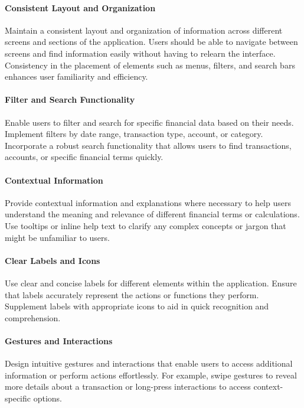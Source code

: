 \paragraph{Consistent Layout and Organization}
Maintain a consistent layout and organization of information across different 
screens and sections of the application. Users should be able to navigate between screens and find information easily 
without having to relearn the interface. Consistency in the placement of elements such as menus, filters, and search 
bars enhances user familiarity and efficiency.

\paragraph{Filter and Search Functionality}
Enable users to filter and search for specific financial data based on their needs. 
Implement filters by date range, transaction type, account, or category. Incorporate a robust search functionality 
that allows users to find transactions, accounts, or specific financial terms quickly.

\paragraph{Contextual Information}
Provide contextual information and explanations where necessary to help users understand the 
meaning and relevance of different financial terms or calculations. Use tooltips or inline help text to clarify any 
complex concepts or jargon that might be unfamiliar to users.

\paragraph{Clear Labels and Icons}
Use clear and concise labels for different elements within the application. Ensure 
that labels accurately represent the actions or functions they perform. Supplement labels with appropriate icons 
to aid in quick recognition and comprehension.

\paragraph{Gestures and Interactions}
Design intuitive gestures and interactions that enable users to access additional 
information or perform actions effortlessly. For example, swipe gestures to reveal more details about a transaction 
or long-press interactions to access context-specific options.


